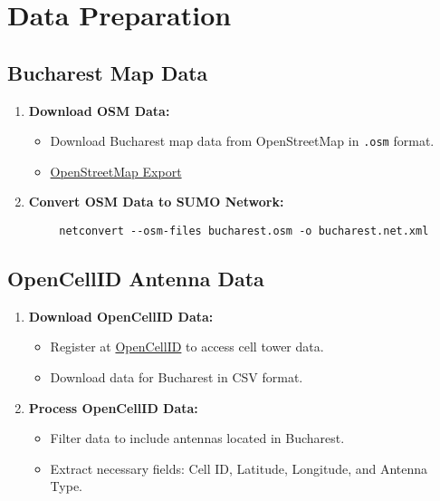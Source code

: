 \documentclass{article}
\begin{document}
	\section{Data Preparation}
	
	\subsection{Bucharest Map Data}
	
	\begin{enumerate}
		\item \textbf{Download OSM Data:}
		\begin{itemize}
			\item Download Bucharest map data from OpenStreetMap in \texttt{.osm} format.
			\item \href{https://www.openstreetmap.org/export#map=12/44.4268/26.1025}{OpenStreetMap Export}
		\end{itemize}
		\item \textbf{Convert OSM Data to SUMO Network:}
	\end{enumerate}
	
	\begin{verbatim}
		netconvert --osm-files bucharest.osm -o bucharest.net.xml
	\end{verbatim}
	
	\subsection{OpenCellID Antenna Data}
	
	\begin{enumerate}
		\item \textbf{Download OpenCellID Data:}
		\begin{itemize}
			\item Register at \href{https://opencellid.org/}{OpenCellID} to access cell tower data.
			\item Download data for Bucharest in CSV format.
		\end{itemize}
		\item \textbf{Process OpenCellID Data:}
		\begin{itemize}
			\item Filter data to include antennas located in Bucharest.
			\item Extract necessary fields: Cell ID, Latitude, Longitude, and Antenna Type.
		\end{itemize}
	\end{enumerate}
	
\end{document}
